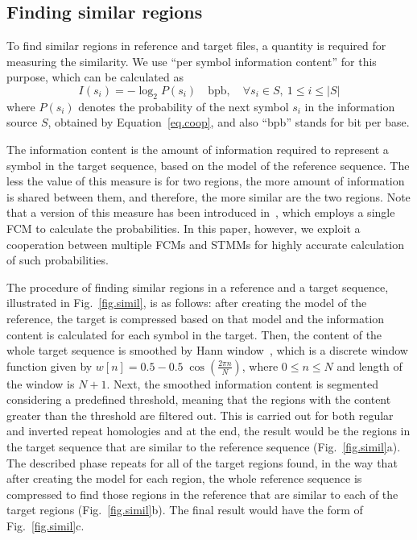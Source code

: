 \subsection{Finding similar regions}
To find similar regions in reference and target files, a quantity is required for measuring the similarity. We use ``per symbol information content'' for this purpose, which can be calculated as
\begin{equation}
  \label{eq.inf.content}
  I(s_i) = -\log_2 P(s_i)\quad \mathrm{bpb}, \quad\forall s_i\in S,~1\le i\le |S|
\end{equation}
where $P(s_i)$ denotes the probability of the next symbol $s_i$ in the information source $S$, obtained by Equation~\ref{eq.coop}, and also ``bpb'' stands for bit per base.

The information content is the amount of information required to represent a symbol in the target sequence, based on the model of the reference sequence. The less the value of this measure is for two regions, the more amount of information is shared between them, and therefore, the more similar are the two regions. Note that a version of this measure has been introduced in~\cite{pratas2015alignment}, which employs a single FCM to calculate the probabilities. In this paper, however, we exploit a cooperation between multiple FCMs and STMMs for highly accurate calculation of such probabilities.

The procedure of finding similar regions in a reference and a target sequence, illustrated in Fig.~\ref{fig.simil}, is as follows: after creating the model of the reference, the target is compressed based on that model and the information content is calculated for each symbol in the target. Then, the content of the whole target sequence is smoothed by Hann window~\cite{blackman1959particular}, which is a discrete window function given by $w[n]=0.5-0.5\;\cos \left({\frac {2\pi n}{N}}\right)$, where $0\le n\le N$ and length of the window is $N+1$. Next, the smoothed information content is segmented considering a predefined threshold, meaning that the regions with the content greater than the threshold are filtered out. This is carried out for both regular and inverted repeat homologies and at the end, the result would be the regions in the target sequence that are similar to the reference sequence (Fig.~\ref{fig.simil}a). The described phase repeats for all of the target regions found, in the way that after creating the model for each region, the whole reference sequence is compressed to find those regions in the reference that are similar to each of the target regions (Fig.~\ref{fig.simil}b). The final result would have the form of Fig.~\ref{fig.simil}c.

